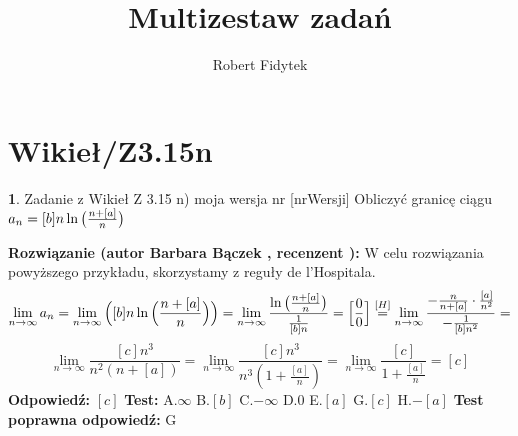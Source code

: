 \documentclass[12pt, a4paper]{article}
\title{Multizestaw zadań}
\author{Robert Fidytek}
\date{}
\theoremstyle{definition} %
\newtheorem{zad}{}
\newcommand{\kategoria}[1]{\section{#1}} %
\newcommand{\zadStart}[1]{\begin{zad}#1\newline} %
\newcommand{\zadStop}{\end{zad}}   %
\newcommand{\rozwStart}[2]{\noindent \textbf{Rozwiązanie (autor #1 , recenzent #2): }\newline} %
\newcommand{\rozwStop}{\newline}                                            %
\newcommand{\odpStart}{\noindent \textbf{Odpowiedź:}\newline}    %
\newcommand{\odpStop}{\newline}                                             %
\newcommand{\testStart}{\noindent \textbf{Test:}\newline} %
\newcommand{\testStop}{\newline} %
\newcommand{\kluczStart}{\noindent \textbf{Test poprawna odpowiedź:}\newline} %
\newcommand{\kluczStop}{\newline} %
\begin{document}
\maketitle


\kategoria{Wikieł/Z3.15n}
\zadStart{Zadanie z Wikieł Z 3.15 n) moja wersja nr [nrWersji]}
Obliczyć granicę ciągu $a_n=[b] n\ln\big{(} \frac{n+[a]}{n} \big{)}$
\zadStop
\rozwStart{Barbara Bączek}{}
W celu rozwiązania powyższego przykładu, skorzystamy z reguły de l'Hospitala.
$$\lim_{n \rightarrow \infty} a_n= \lim_{n \rightarrow \infty} \Big{(} [b]n\ln\Big{(} \frac{n+[a]}{n} \Big{)} \Big{)}= \lim_{n \rightarrow \infty} \frac{\ln\big{(} \frac{n+[a]}{n}\big{)}}{\frac{1}{[b]n}}=\Big{[} \frac{0}{0}\Big{]} \stackrel{[H]}{=}  \lim_{n \rightarrow \infty} \frac{-\frac{n}{n+[a]} \cdot \frac{[a]}{n^2}}{-\frac{1}{[b]n^2}}=$$
$$\lim_{n \rightarrow \infty} \frac{[c]n^3}{n^2(n+[a])}=\lim_{n \rightarrow \infty} \frac{[c]n^3}{n^3(1+\frac{[a]}{n})}=\lim_{n \rightarrow \infty} \frac{[c]}{1+\frac{[a]}{n}}=[c]$$
\rozwStop
\odpStart
$[c]$
\odpStop
\testStart
A.$\infty$
B.$[b]$
C.$-\infty$
D.$0$
E.$[a]$
G.$[c]$
H.$-[a]$
\testStop
\kluczStart
G
\kluczStop
\end{document}
